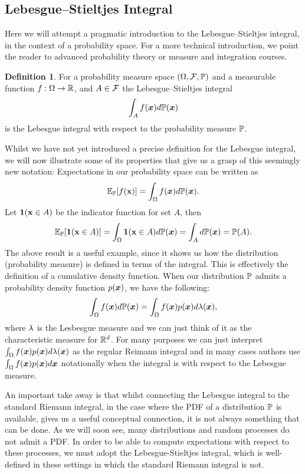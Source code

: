 \documentclass[a4paper,12pt,twoside,openright]{report}
\theoremstyle{definition}
\newtheorem{definition}{Definition}[section]
\begin{document}
\subsection{Lebesgue–Stieltjes Integral}
Here we will attempt a pragmatic introduction to the Lebesgue–Stieltjes integral, in the context of a probability space. For a more technical introduction, we point the reader to advanced probability theory or measure and integration courses.
\begin{definition}\label{def:lebesgue}
For a probability measure space $\probspace$ and a measurable function $f: \Omega \rightarrow \R $, and $A \in \calF$ the Lebesgue–Stieltjes integral
\begin{align}
    \int_{A} f(\vx) d\P(\vx)
\end{align}
is the Lebesgue integral with respect to the probability measure $\P$.
\end{definition}
Whilst we have not yet introduced a precise definition for the Lebesgue integral, we will now illustrate some of its properties that give us a grasp of this seemingly new notation:
Expectations in our probability space can be written as
\begin{align}
     \E_{\P}[f(\rvx)] = \int_{\Omega} f(\vx) d\P(\vx).
\end{align}
Let $\ind(\rvx \in A)$ be the indicator function for set $A$, then
\begin{align}
    \E_{\P}[\ind(\rvx \in A)] = \int_{\Omega} \ind(\rvx \in A) d\P(\vx) = \int_{A} d\P(\vx) = \P(A).
\end{align}
The above result is a useful example, since it shows us how the distribution (probability measure) is defined in terms of the integral. This is effectively  the definition of a cumulative density function.
When our distribution $\P$ admits a probability density function $p(\vx)$, we have the following:
\begin{align}
    \int_{\Omega} f(\vx) d\P(\vx) = \int_{\Omega} f(\vx)p(\vx) d\callambda(\vx),
\end{align}
where $\callambda$ is the Lesbesgue measure and we can just think of it as the characteristic measure for $\R^d$. For many purposes we can just interpret $\int_{\Omega} f(\vx)p(\vx) d\callambda(\vx)$ as the regular Reimann integral and in many cases authors \citep{williams2006gaussian} use $\int_{\Omega} f(\vx)p(\vx) d\vx$ notationally when the integral is with respect to the Lebesgue measure.

An important take away is that whilst connecting the Lebesgue integral to the standard Riemann integral, in the case where the PDF of a distribution $\P$ is available, gives us a useful conceptual connection, it is not always something that can be done. As we will soon see, many distributions and random processes do not admit a PDF. In order to be able to compute expectations with respect to these processes, we must adopt the Lebesgue-Stieltjes integral, which is well-defined in these settings in which the standard Riemann integral is not.
\end{document}
